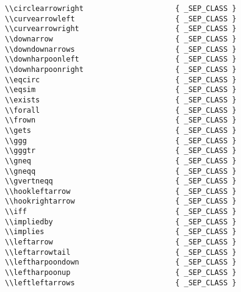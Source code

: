 \begin{verbatim}
\\circlearrowright                     { _SEP_CLASS }
\\curvearrowleft                       { _SEP_CLASS }
\\curvearrowright                      { _SEP_CLASS }
\\downarrow                            { _SEP_CLASS }
\\downdownarrows                       { _SEP_CLASS }
\\downharpoonleft                      { _SEP_CLASS }
\\downharpoonright                     { _SEP_CLASS }
\\eqcirc                               { _SEP_CLASS }
\\eqsim                                { _SEP_CLASS }
\\exists                               { _SEP_CLASS }
\\forall                               { _SEP_CLASS }
\\frown                                { _SEP_CLASS }
\\gets                                 { _SEP_CLASS }
\\ggg                                  { _SEP_CLASS }
\\gggtr                                { _SEP_CLASS }
\\gneq                                 { _SEP_CLASS }
\\gneqq                                { _SEP_CLASS }
\\gvertneqq                            { _SEP_CLASS }
\\hookleftarrow                        { _SEP_CLASS }
\\hookrightarrow                       { _SEP_CLASS }
\\iff                                  { _SEP_CLASS }
\\impliedby                            { _SEP_CLASS }
\\implies                              { _SEP_CLASS }
\\leftarrow                            { _SEP_CLASS }
\\leftarrowtail                        { _SEP_CLASS }
\\leftharpoondown                      { _SEP_CLASS }
\\leftharpoonup                        { _SEP_CLASS }
\\leftleftarrows                       { _SEP_CLASS }

\end{verbatim}
